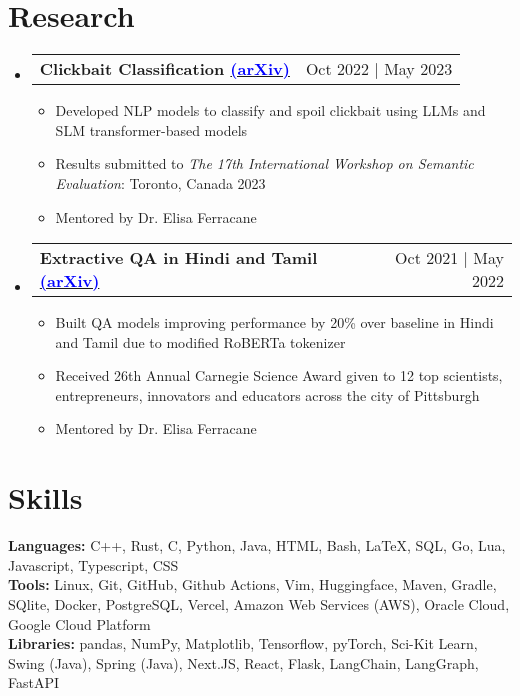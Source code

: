 \documentclass{article}
\makeatletter
\newcommand{\resumeItem}[1]{
  \item\small{
    {#1 \vspace{-2pt}}
  }
}
\newcommand{\resumeProjectHeading}[2]{
    \item
    \begin{tabular*}{0.97\textwidth}{l@{\extracolsep{\fill}}r}
      \small#1 & #2 \\
    \end{tabular*}\vspace{-7pt}
}
\newcommand{\resumeSubHeadingListStart}{\begin{itemize}[leftmargin=0.15in, label={}]}
\newcommand{\resumeSubHeadingListEnd}{\end{itemize}}
\newcommand{\resumeItemListStart}{\begin{itemize}}
\newcommand{\resumeItemListEnd}{\end{itemize}\vspace{-5pt}}
\makeatother
\begin{document}
\section{Research}
\resumeSubHeadingListStart
\resumeProjectHeading
{\textbf{Clickbait Classification \href{https://doi.org/10.48550/arXiv.2306.14907}{\textcolor{blue}{(arXiv)}}}} {Oct 2022 | May 2023}
\resumeItemListStart
\resumeItem{Developed NLP models to classify and spoil clickbait using LLMs and SLM transformer-based models}
\resumeItem{Results submitted to \textit{The 17th International Workshop on Semantic Evaluation}: Toronto, Canada 2023}
\resumeItem{Mentored by Dr. Elisa Ferracane}
\resumeItemListEnd

\resumeProjectHeading
{\textbf{Extractive QA in Hindi and Tamil \href{https://doi.org/10.48550/arXiv.2210.06356}{\textcolor{blue}{(arXiv)}}}}{Oct 2021 | May 2022}
\resumeItemListStart
\resumeItem{Built QA models improving performance by 20\% over baseline in Hindi and Tamil due to modified RoBERTa tokenizer}
\resumeItem{Received 26th Annual Carnegie Science Award given to 12 top scientists, entrepreneurs, innovators and educators across the city of Pittsburgh}
\resumeItem{Mentored by Dr. Elisa Ferracane}
\resumeItemListEnd

\resumeSubHeadingListEnd

\vspace{-10pt}
\section{Skills}
\begin{itemize}[leftmargin=0.15in, label={}]
	\small{\item{

		            \textbf{Languages:}{ C++, Rust, C, Python, Java, HTML, Bash, \LaTeX, SQL, Go, Lua, Javascript, Typescript, CSS} \\
                \textbf{Tools:}{ Linux, Git, GitHub, Github Actions, Vim, Huggingface, Maven, Gradle, SQlite, Docker, PostgreSQL, Vercel, Amazon Web Services (AWS), Oracle Cloud, Google Cloud Platform}\\
		            \textbf{Libraries:}{ pandas, NumPy, Matplotlib, Tensorflow, pyTorch, Sci-Kit Learn, Swing (Java), Spring (Java), Next.JS, React, Flask, LangChain, LangGraph, FastAPI}

		      }}
\end{itemize}
\vspace{-10pt}
\end{document}
